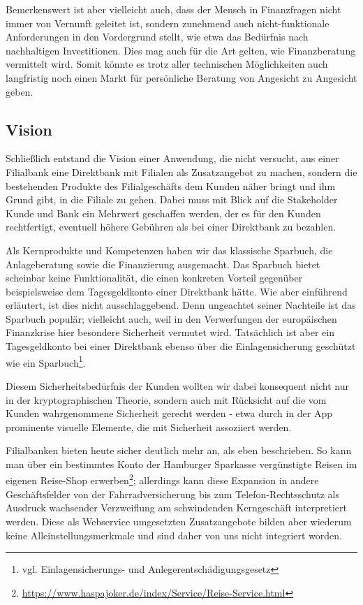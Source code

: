  Bemerkenswert ist aber vielleicht auch, dass der Mensch in Finanzfragen nicht immer von Vernunft geleitet ist, sondern zunehmend auch nicht-funktionale Anforderungen in den Vordergrund stellt, wie etwa das Bedürfnis nach nachhaltigen Investitionen. Dies mag auch für die Art gelten, wie Finanzberatung vermittelt wird. Somit könnte es trotz aller technischen Möglichkeiten auch langfristig noch einen Markt für persönliche Beratung von Angesicht zu Angesicht geben.
 
\subsection{Vision}

Schließlich entstand die Vision einer Anwendung, die nicht versucht, aus einer Filialbank eine Direktbank mit Filialen als Zusatzangebot zu machen, sondern die bestehenden Produkte des Filialgeschäfts dem Kunden näher bringt und ihm Grund gibt, in die Filiale zu gehen. Dabei muss mit Blick auf die Stakeholder Kunde und Bank ein Mehrwert geschaffen werden, der es für den Kunden rechtfertigt, eventuell höhere Gebühren als bei einer Direktbank zu bezahlen.

Als Kernprodukte und Kompetenzen haben wir das klassische Sparbuch, die Anlageberatung sowie die Finanzierung ausgemacht. Das Sparbuch bietet scheinbar keine Funktionalität, die einen konkreten Vorteil gegenüber beispielsweise dem Tagesgeldkonto einer Direktbank hätte. Wie aber einführend erläutert, ist dies nicht ausschlaggebend. Denn ungeachtet seiner Nachteile ist das Sparbuch populär; vielleicht auch, weil in den Verwerfungen der europäischen Finanzkrise hier besondere Sicherheit vermutet wird. Tatsächlich ist aber ein Tagesgeldkonto bei einer Direktbank ebenso über die Einlagensicherung geschützt wie ein Sparbuch\footnote{vgl. Einlagensicherungs- und Anlegerentschädigungsgesetz}.

Diesem Sicherheitsbedürfnis der Kunden wollten wir dabei konsequent nicht nur in der kryptographischen Theorie, sondern auch mit Rücksicht auf die vom Kunden wahrgenommene Sicherheit gerecht werden - etwa durch in der App prominente visuelle Elemente, die mit Sicherheit assoziiert werden.

Filialbanken bieten heute sicher deutlich mehr an, als eben beschrieben. So kann man über ein bestimmtes Konto der Hamburger Sparkasse vergünstigte Reisen im eigenen Reise-Shop erwerben\footnote{\url{https://www.haspajoker.de/index/Service/Reise-Service.html}}; allerdings kann diese Expansion in andere Geschäftsfelder von der Fahrradversicherung bis zum Telefon-Rechtsschutz als Ausdruck wachsender Verzweiflung am schwindenden Kerngeschäft interpretiert werden. Diese als Webservice umgesetzten Zusatzangebote bilden aber wiederum keine Alleinstellungsmerkmale und sind daher von uns nicht integriert worden.

